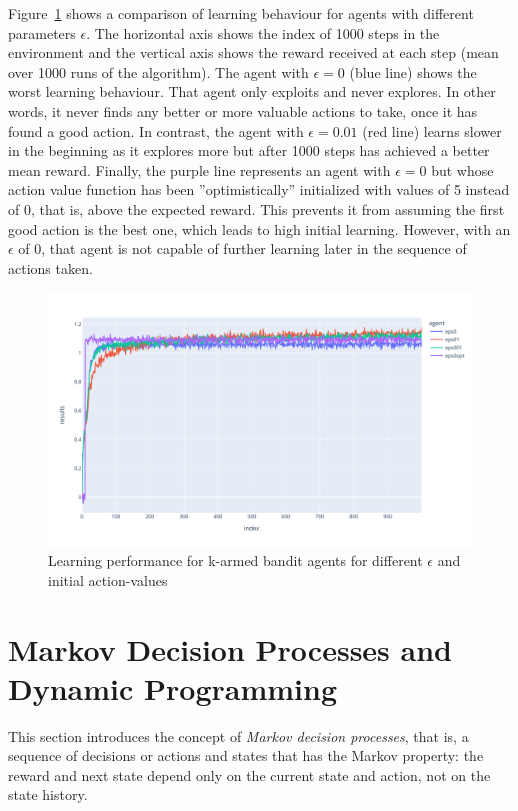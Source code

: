 Figure~\ref{fig:banditresults} shows a comparison of learning behaviour for agents with different parameters $\epsilon$. The horizontal axis shows the index of 1000 steps in the environment and the vertical axis shows the reward received at each step (mean over 1000 runs of the algorithm). The agent with $\epsilon=0$ (blue line) shows the worst learning behaviour. That agent only exploits and never explores. In other words, it never finds any better or more valuable actions to take, once it has found a good action. In contrast, the agent with $\epsilon=0.01$ (red line) learns slower in the beginning as it explores more but after 1000 steps has achieved a better mean reward. Finally, the purple line represents an agent with $\epsilon=0$ but whose action value function has been ''optimistically'' initialized with values of 5 instead of 0, that is, above the expected reward. This prevents it from assuming the first good action is the best one, which leads to high initial learning. However, with an $\epsilon$ of 0, that agent is not capable of further learning later in the sequence of actions taken. 

\begin{figure}
\centering

\includegraphics[width=.9\textwidth]{bandits.pdf}
\caption{Learning performance for k-armed bandit agents for different $\epsilon$ and initial action-values}
\label{fig:banditresults}
\end{figure}

\section{Markov Decision Processes and Dynamic Programming}

This section introduces the concept of \emph{Markov decision processes}, that is, a sequence of decisions or actions and states that has the Markov property: the reward and next state depend only on the current state and action, not on the state history.

